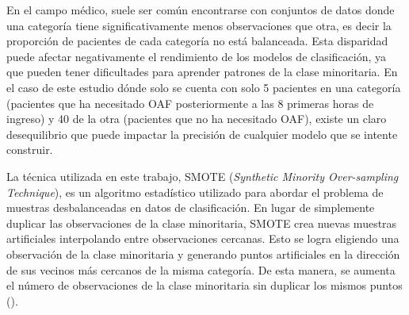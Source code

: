 En el campo médico, suele ser común encontrarse con conjuntos de datos donde una categoría tiene significativamente menos observaciones que otra, es decir la proporción de pacientes de cada categoría no está balanceada. Esta disparidad puede afectar negativamente el rendimiento de los modelos de clasificación, ya que pueden tener dificultades para aprender patrones de la clase minoritaria. En el caso de este estudio dónde solo se cuenta con solo 5 pacientes en una categoría (pacientes que ha necesitado OAF posteriormente a las $8$ primeras horas de ingreso) y 40  de la  otra (pacientes que no ha necesitado OAF), existe un claro desequilibrio que puede impactar la precisión de cualquier modelo que se intente construir.

La técnica utilizada en este trabajo, SMOTE (\textit{Synthetic Minority Over-sampling Technique}), es un algoritmo estadístico utilizado para abordar el problema de muestras desbalanceadas en datos de clasificación. En lugar de simplemente duplicar las observaciones de la clase minoritaria, SMOTE crea nuevas muestras artificiales interpolando entre observaciones cercanas. Esto se logra eligiendo una observación de la clase minoritaria y generando puntos artificiales en la dirección de sus vecinos más cercanos de la misma categoría. De esta manera, se aumenta el número de observaciones de la clase minoritaria sin duplicar los mismos puntos (\cite{Chawla2002}).
\newpage


\newpage



\newpage